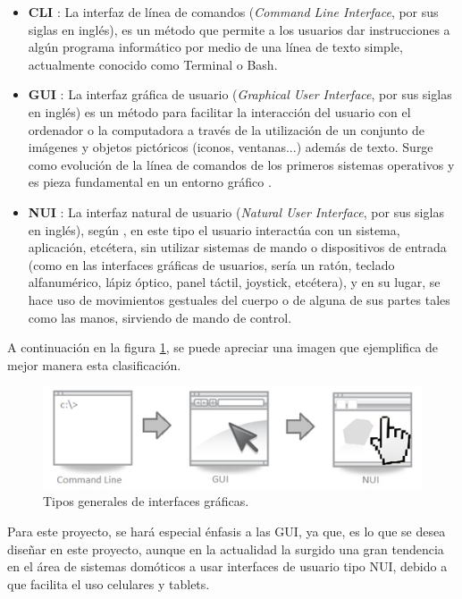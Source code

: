\begin{itemize}
\item \textbf{CLI} : La interfaz de línea de comandos (\textit{Command Line Interface}, por sus siglas en inglés), es un método que permite a los usuarios dar instrucciones a algún programa informático por medio de una línea de texto simple, actualmente conocido como Terminal o Bash.
\item \textbf{GUI} : La interfaz gráfica de usuario (\textit{Graphical User Interface}, por sus siglas en inglés)  es un método para facilitar la interacción del usuario con el ordenador o la computadora a través de la utilización de un conjunto de imágenes y objetos pictóricos (iconos, ventanas...) además de texto. Surge como evolución de la línea de comandos de los primeros sistemas operativos y es pieza fundamental en un entorno gráfico \cite{Pavon2017}.

\item \textbf{NUI} : La interfaz natural de usuario (\textit{Natural User Interface}, por sus siglas en inglés), según \cite{Pavon2017}, en este tipo el usuario interactúa con un sistema, aplicación, etcétera, sin utilizar sistemas de mando o dispositivos de entrada (como en las interfaces gráficas de usuarios, sería un ratón, teclado alfanumérico, lápiz óptico, panel táctil, joystick, etcétera), y en su lugar, se hace uso de movimientos gestuales del cuerpo o de alguna de sus partes tales como las manos, sirviendo de mando de control.
\end{itemize}

A continuación en la figura \ref{F:GUI}, se puede apreciar una imagen que ejemplifica de mejor manera esta clasificación.

\begin{figure}[H]
\centering
\includegraphics[width=\textwidth]{./imagenes/teoria/gui.jpg} 
\caption{Tipos generales de interfaces gráficas.}
\label{F:GUI}
\end{figure}

Para este proyecto, se hará especial énfasis a las GUI, ya que, es lo que  se desea diseñar en este proyecto, aunque en la actualidad la surgido una gran tendencia en el área de sistemas domóticos a usar interfaces de usuario tipo NUI, debido a que facilita el uso celulares y tablets. 

